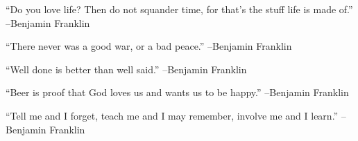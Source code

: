 \documentclass{article}%
\begin{document}
\begin{minipage}{\textwidth}%
\flushleft%
“Do you love life? Then do not squander time, for that's the stuff life is made of.”%
\linebreak%
\vspace{1mm}%
–Benjamin Franklin%
\linebreak%
\vspace{1mm}%
\end{minipage}%
\linebreak%
\vspace{1mm}%
\begin{minipage}{\textwidth}%
\flushleft%
“There never was a good war, or a bad peace.”%
\linebreak%
\vspace{1mm}%
–Benjamin Franklin%
\linebreak%
\vspace{1mm}%
\end{minipage}%
\linebreak%
\vspace{1mm}%
\begin{minipage}{\textwidth}%
\flushleft%
“Well done is better than well said.”%
\linebreak%
\vspace{1mm}%
–Benjamin Franklin%
\linebreak%
\vspace{1mm}%
\end{minipage}%
\linebreak%
\vspace{1mm}%
\begin{minipage}{\textwidth}%
\flushleft%
“Beer is proof that God loves us and wants us to be happy.”%
\linebreak%
\vspace{1mm}%
–Benjamin Franklin%
\linebreak%
\vspace{1mm}%
\end{minipage}%
\linebreak%
\vspace{1mm}%
\begin{minipage}{\textwidth}%
\flushleft%
“Tell me and I forget, teach me and I may remember, involve me and I learn.”%
\linebreak%
\vspace{1mm}%
–Benjamin Franklin%
\linebreak%
\vspace{1mm}%
\end{minipage}%
\linebreak%
\end{document}
